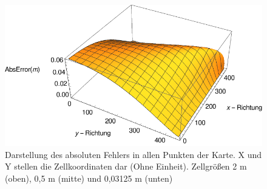 \begin{figure}
\begin{minipage}{.8\textwidth}
\end{minipage}
\\
\begin{minipage}{.8\textwidth}
\centering
  \includegraphics[width=1\linewidth]{abbildungen/vergleich_euklid_fast_marching/3DVergleich/cellsize0_03125/Error.pdf}
\end{minipage}
\caption{Darstellung des absoluten Fehlers in allen Punkten der Karte. X und Y stellen die Zellkoordinaten dar (Ohne Einheit). Zellgrößen 2 m (oben), 0,5 m (mitte) und 0,03125 m (unten)}
\label{fig_error_3d_aufstellung}
\end{figure}





